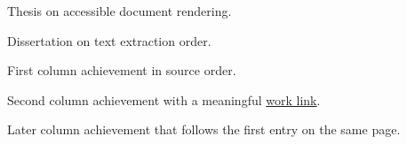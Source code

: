 \documentclass{careerdossier-resume}
\begin{document}
\MakeCDossierHeader
{}
\begin{CDossierEntry}[
  title={PhD, Physics},
  organization={Example University},
  location={Toronto},
  dates={2012--2016}
]
\begin{CDossierItemize}
  \item Thesis on accessible document rendering.
\end{CDossierItemize}
\end{CDossierEntry}
\begin{CDossierEntry}[
  title={MSc, Physics},
  organization={Example Institute},
  location={Ottawa},
  dates={2010--2012}
]
\begin{CDossierItemize}
  \item Dissertation on text extraction order.
\end{CDossierItemize}
\end{CDossierEntry}
\begin{CDossierEntry}[
  title={Engineer},
  organization={Example Labs},
  location={Toronto},
  dates={2024--2026}
]
\begin{CDossierItemize}
  \item First column achievement in source order.
  \item Second column achievement with a meaningful
        \href{https://example.test/work}{work link}.
\end{CDossierItemize}
\end{CDossierEntry}
\begin{CDossierEntry}[
  title={Associate Engineer},
  organization={Example Services},
  location={Ottawa},
  dates={2022--2024}
]
\begin{CDossierItemize}
  \item Later column achievement that follows the first entry on the same page.
\end{CDossierItemize}
\end{CDossierEntry}
\end{document}
